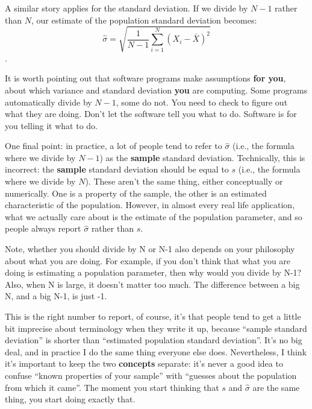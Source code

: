 \documentclass[]{book}
\newenvironment{marginnote}%
  {\itshape}%
  {}
\begin{document}
A similar story applies for the standard deviation. If we divide by \(N-1\) rather than \(N\), our estimate of the population standard deviation becomes: \[\hat\sigma = \sqrt{\frac{1}{N-1} \sum_{i=1}^N (X_i - \bar{X})^2}\].

It is worth pointing out that software programs make assumptions \textbf{for you}, about which variance and standard deviation \textbf{you} are computing. Some programs automatically divide by \(N-1\), some do not. You need to check to figure out what they are doing. Don't let the software tell you what to do. Software is for you telling it what to do.

One final point: in practice, a lot of people tend to refer to \(\hat{\sigma}\) (i.e., the formula where we divide by \(N-1\)) as the \textbf{sample} standard deviation. Technically, this is incorrect: the \textbf{sample} standard deviation should be equal to \(s\) (i.e., the formula where we divide by \(N\)). These aren't the same thing, either conceptually or numerically. One is a property of the sample, the other is an estimated characteristic of the population. However, in almost every real life application, what we actually care about is the estimate of the population parameter, and so people always report \(\hat\sigma\) rather than \(s\).

\begin{marginnote}

Note, whether you should divide by N or N-1 also depends on your philosophy about what you are doing. For example, if you don't think that what you are doing is estimating a population parameter, then why would you divide by N-1? Also, when N is large, it doesn't matter too much. The difference between a big N, and a big N-1, is just -1.

\end{marginnote}

This is the right number to report, of course, it's that people tend to get a little bit imprecise about terminology when they write it up, because ``sample standard deviation'' is shorter than ``estimated population standard deviation''. It's no big deal, and in practice I do the same thing everyone else does. Nevertheless, I think it's important to keep the two \textbf{concepts} separate: it's never a good idea to confuse ``known properties of your sample'' with ``guesses about the population from which it came''. The moment you start thinking that \(s\) and \(\hat\sigma\) are the same thing, you start doing exactly that.
\end{document}
